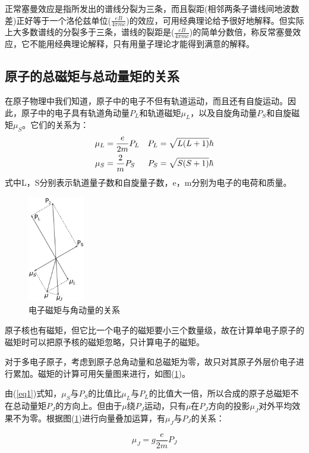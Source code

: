 \documentclass{buaaemp}
\begin{document}
正常塞曼效应是指所发出的谱线分裂为三条，而且裂距(相邻两条子谱线间地波数差)正好等于一个洛伦兹单位($\frac{eB}{4\pi mc}$)的效应，可用经典理论给予很好地解释。但实际上大多数谱线的分裂多于三条，谱线的裂距是($\frac{eB}{4\pi mc}$)的简单分数倍，称反常塞曼效应，它不能用经典理论解释，只有用量子理论才能得到满意的解释。

\subsection{原子的总磁矩与总动量矩的关系}
在原子物理中我们知道，原子中的电子不但有轨道运动，而且还有自旋运动。因此，原子中的电子具有轨道角动量$P_L$和轨道磁矩$\mu_L$，以及自旋角动量$P_S$和自旋磁矩$\mu_S$。它们的关系为：
\begin{align}
\mu_L &= \frac{e}{2m}P_L & P_L &= \sqrt{L(L+1)}\hbar \notag \\
\mu_S &= \frac{2}{m}P_S & P_S &= \sqrt{S(S+1)}\hbar\label{eq1}
\end{align}
式中L，S分别表示轨道量子数和自旋量子数，e，m分别为电子的电荷和质量。

\begin{figure}
\centering
\includegraphics[width=0.22\textwidth]{fig1.pdf}
\caption{电子磁矩与角动量的关系}\label{fig1}
\end{figure}

原子核也有磁矩，但它比一个电子的磁矩要小三个数量级，故在计算单电子原子的磁矩时可以把原予核的磁矩忽略，只计算电子的磁矩。

对于多电子原子，考虑到原子总角动量和总磁矩为零，故只对其原子外层价电子进行累加。磁矩的计算可用矢量图来进行，如图(\ref{fig1})。

由(\ref{eq1})式知，$\mu_S$与$P_S$的比值比$\mu_L$与$P_L$的比值大一倍，所以合成的原子总磁矩不在总动量矩$P_J$的方向上。但由于$\mu$绕$P_J$运动，只有$\mu$在$P_J$方向的投影$\mu_J$对外平均效果不为零。根据图(\ref{fig1})进行向量叠加运算，有$\mu_J$与$P_J$的关系：

\begin{equation*}
\mu_J = g\frac{e}{2m}P_J
\end{equation*}
\end{document}
